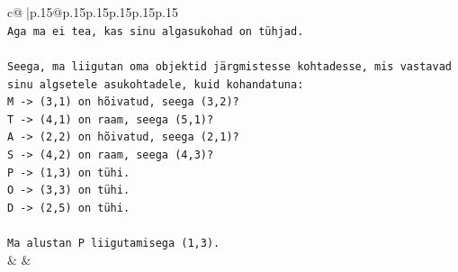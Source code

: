 \documentclass{article}
\begin{document}
{\begin{supertabular}{c@{$\;$}|p{.15\linewidth}@{}p{.15\linewidth}p{.15\linewidth}p{.15\linewidth}p{.15\linewidth}p{.15\linewidth}}
{{{\\ 
\texttt{Aga ma ei tea, kas sinu algasukohad on tühjad.} \\
\\ 
\texttt{Seega, ma liigutan oma objektid järgmistesse kohtadesse, mis vastavad sinu algsetele asukohtadele, kuid kohandatuna:} \\
\texttt{M {-}> (3,1) on hõivatud, seega (3,2)?} \\
\texttt{T {-}> (4,1) on raam, seega (5,1)?} \\
\texttt{A {-}> (2,2) on hõivatud, seega (2,1)?} \\
\texttt{S {-}> (4,2) on raam, seega (4,3)?} \\
\texttt{P {-}> (1,3) on tühi.} \\
\texttt{O {-}> (3,3) on tühi.} \\
\texttt{D {-}> (2,5) on tühi.} \\
\\ 
\texttt{Ma alustan P liigutamisega (1,3).} \\
            }
        }
    }
    & & \\ \\


\end{supertabular}}
\end{document}
